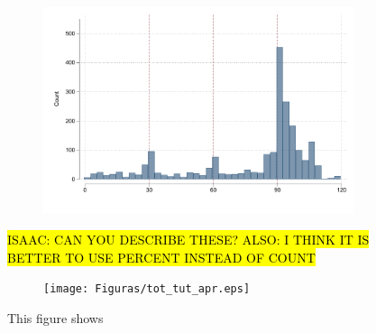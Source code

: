 \documentclass[oneside,11pt]{article}
\begin{document}
{\begin{figure}[H]
\begin{center}
\begin{subfigure}{0.31\textwidth}
        \includegraphics[width=\textwidth]{Figuras/hist_payments_cc.pdf}
    \end{subfigure}    
    \end{center}
     \scriptsize
     \hl{ISAAC: CAN YOU DESCRIBE THESE? ALSO: I THINK IT IS BETTER TO USE PERCENT INSTEAD OF COUNT}
\end{figure}







\cleardoublepage







\cleardoublepage



\begin{figure}[H]
     \caption{ToT \& TuT as LATE}
    \label{tot_tut_graph}
    \begin{center}
    \begin{subfigure}{0.9\textwidth}
        \centering
        \texttt{[image: Figuras/tot\_tut\_apr.eps]}
    \end{subfigure}
    \end{center}
    \scriptsize
    This figure shows 
\end{figure}



}
\end{document}

